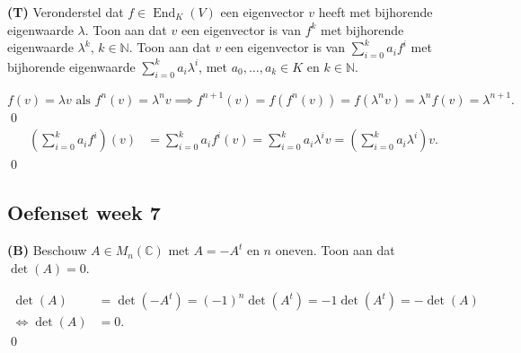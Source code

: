 \begin{oefening}[6.2.1] \textbf{(T)}
    Veronderstel dat $f \in \operatorname{End}_K(V)$ een eigenvector $v$ heeft met bijhorende eigenwaarde $\lambda$. Toon aan dat $v$ een eigenvector is van $f^k$ met bijhorende eigenwaarde $\lambda^k$, $k \in \mathbb{N}$.
    Toon aan dat $v$ een eigenvector is van $\sum_{i=0}^k a_i f^i$ met bijhorende eigenwaarde $\sum_{i=0}^k a_i \lambda^i$, met $a_0, \dots, a_k \in K$ en $k \in \mathbb{N}$.

    \(f(v) = \lambda v \text{ als } f^n(v) = \lambda^n v \implies f^{n+1}(v) 
    =  f(f^{n}(v)) = f(\lambda^n v) = \lambda^n f(v) = \lambda^{n+1}.\)\qed
    \begin{align*}
        \left(\sum_{i=0}^k a_i f^i\right)(v)
        &= \sum_{i=0}^k a_i f^i(v) 
        = \sum_{i=0}^k a_i \lambda^{i} v
         = \left(\sum_{i=0}^k a_i \lambda^{i}\right) v.
    \end{align*}\qed
\end{oefening}

\subsection{Oefenset week 7}

\begin{oefening}[5.4.3] \textbf{(B)}
    Beschouw $A \in M_n(\mathbb{C})$ met $A = -A^t$ en $n$ oneven. Toon aan dat $\det(A) = 0$.

    \begin{align*}
        \det (A) 
        &= \det(-A^t)
        = (-1)^n \det(A^t)
        = -1 \det(A^t)
        = - \det(A)\\
        \iff \det(A) &= 0 .
    \end{align*}\qed
\end{oefening}